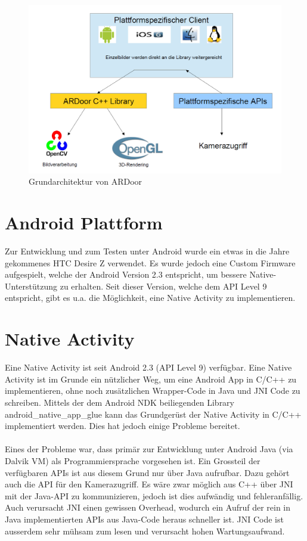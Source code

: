 \begin{figure}[!ht]
\centering
\includegraphics[scale=0.4]{images/architecture.png} 
\caption{Grundarchitektur von ARDoor}
\label{fig:android-architecture}
\end{figure}

\section{Android Plattform}
Zur Entwicklung und zum Testen unter Android wurde ein etwas in die Jahre gekommenes HTC Desire Z verwendet. Es wurde jedoch eine Custom Firmware aufgespielt, welche der Android Version 2.3 entspricht, um bessere Native-Unterstützung zu erhalten. Seit dieser Version, welche dem API Level 9 entspricht, gibt es u.a. die Möglichkeit, eine Native Activity zu implementieren.


\section{Native Activity}
Eine Native Activity ist seit Android 2.3 (API Level 9) verfügbar. Eine Native Activity ist im Grunde ein nützlicher Weg, um eine Android App in C/C++ zu implementieren, ohne noch zusätzlichen Wrapper-Code in Java und JNI Code zu schreiben. Mittels der dem Android NDK beiliegenden Library android\_native\_app\_glue kann das Grundgerüst der Native Activity in C/C++ implementiert werden. Dies hat jedoch einige Probleme bereitet.

\paragraph{}
Eines der Probleme war, dass primär zur Entwicklung unter Android Java (via Dalvik VM) als Programmiersprache vorgesehen ist. Ein Grossteil der verfügbaren APIs ist aus diesem Grund nur über Java aufrufbar. Dazu gehört auch die API für den Kamerazugriff. Es wäre zwar möglich aus C++ über JNI mit der Java-API zu kommunizieren, jedoch ist dies aufwändig und fehleranfällig. Auch verursacht JNI einen gewissen Overhead, wodurch ein Aufruf der rein in Java implementierten APIs aus Java-Code heraus schneller ist. JNI Code ist ausserdem sehr mühsam zum lesen und verursacht hohen Wartungsaufwand.

